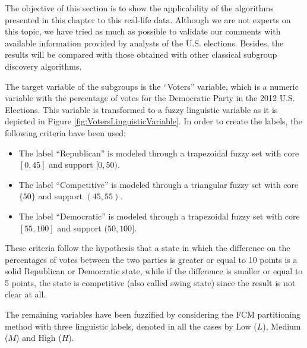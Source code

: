 The objective of this section is to show the applicability of the algorithms presented in this chapter to this real-life data. Although we are not experts on this topic, we have tried as much as possible to validate our comments with available information provided by analysts of the U.S. elections. Besides, the results will be compared with those obtained with other classical subgroup discovery algorithms. 

The target variable of the subgroups is the ``Voters'' variable, which is a numeric variable with the percentage of votes for the Democratic Party in the 2012 U.S. Elections. This variable is transformed to a fuzzy linguistic variable as it is depicted in Figure \ref{fig:VotersLinguisticVariable}. In order to create the labels, the following criteria have been used:
\begin{itemize}
	\item The label ``Republican'' is modeled through a trapezoidal fuzzy set with core $[0,45]$ and support $[0,50)$.
	\item The label ``Competitive'' is modeled through a triangular fuzzy set with core $\{50\}$ and support $(45,55)$.
	\item The label ``Democratic'' is modeled through a trapezoidal fuzzy set with core $[55,100]$ and support $(50,100]$.
\end{itemize}   
These criteria follow the hypothesis that a state in which the difference on the percentages of votes between the two parties is greater or equal to 10 points is a solid Republican or Democratic state, while if the difference is smaller or equal to 5 points, the state is competitive (also called swing state) since the result is not clear at all.  

The remaining variables have been fuzzified by considering the FCM partitioning method with three linguistic labels, denoted in all the cases by Low ($L$), Medium ($M$) and High ($H$).

